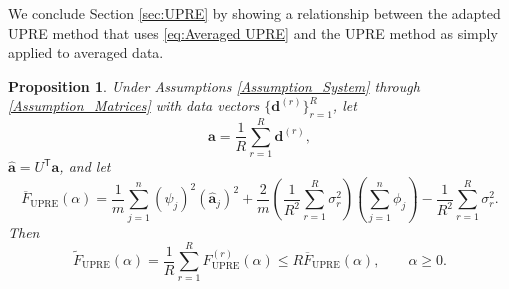 \documentclass[12pt]{article}
\newcommand{\mA}{m}	%
\newcommand{\aVec}{\mathbf{a}}	%
\newcommand{\dVec}{\mathbf{d}}	%
\newcommand{\trans}[1]{{#1}^\mathsf{T}}	%
\newcommand{\dft}[1]{\widehat{#1}}	%
\newcommand{\regparam}{\alpha}  %
\newcommand{\filt}{\phi}
\newcommand{\mfilt}{\psi}
\newcommand{\noiseSD}{\sigma}	%
\newcommand{\U}{F_{\text{UPRE}}}	%
\newcommand{\UBig}{\widetilde{F}_{\text{UPRE}}}	%
\newcommand{\UAvg}{\overline{F}_{\text{UPRE}}}	%
\newtheorem{proposition}{Proposition}[section]
\begin{document}
We conclude Section \ref{sec:UPRE} by showing a relationship between the adapted UPRE method that uses \eqref{eq:Averaged UPRE} and the UPRE method as simply applied to averaged data. 

\begin{proposition}
Under Assumptions \ref{Assumption_System} through \ref{Assumption_Matrices} with data vectors $\{\dVec^{(r)}\}_{r=1}^R$, let 
\begin{equation}
\label{eq:Averaged data}
\aVec = \frac{1}{R}\sum_{r=1}^R \dVec^{(r)},
\end{equation}
$\dft{\aVec} = \trans{U}\aVec$, and let
\begin{equation}
\label{eq:UPRE of Average}
\UAvg(\regparam) = \frac{1}{\mA}\sum_{j=1}^{n} \left(\mfilt_j\right)^2\left(\dft{\aVec}_j\right)^2 + \frac{2}{\mA} \left(\frac{1}{R^2} \sum_{r=1}^R \noiseSD_r^2\right) \left(\sum_{j=1}^{n} \filt_j\right) - \frac{1}{R^2} \sum_{r=1}^R\noiseSD_r^2.
\end{equation}
Then
\begin{equation}
\label{eq:UPRE Bound}
\UBig(\regparam) = \frac{1}{R} \sum_{r=1}^R \U^{(r)}(\regparam) \leq R \UAvg(\regparam), \qquad \regparam \geq 0.
\end{equation}
\end{proposition}
\end{document}
